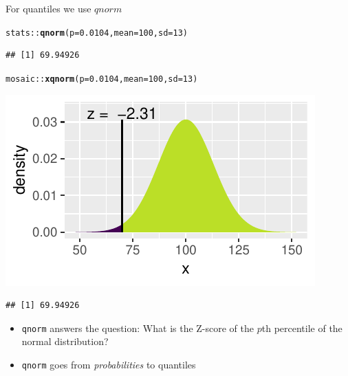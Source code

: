 \documentclass[handout]{beamer}\usepackage[]{graphicx}\usepackage[]{color}
\newcommand{\hlnum}[1]{\textcolor[rgb]{0.686,0.059,0.569}{#1}}%
\newcommand{\hlopt}[1]{\textcolor[rgb]{0,0,0}{#1}}%
\newcommand{\hlstd}[1]{\textcolor[rgb]{0.345,0.345,0.345}{#1}}%
\newcommand{\hlkwc}[1]{\textcolor[rgb]{0.333,0.667,0.333}{#1}}%
\newcommand{\hlkwd}[1]{\textcolor[rgb]{0.737,0.353,0.396}{\textbf{#1}}}%
\newenvironment{knitrout}{}{} %
\begin{document}
\begin{frame}[fragile]{For quantiles we use $qnorm$}



\begin{knitrout}\scriptsize
{}\color{fgcolor}
\begin{alltt}
\hlstd{stats}\hlopt{::}\hlkwd{qnorm}\hlstd{(}\hlkwc{p} \hlstd{=} \hlnum{0.0104}\hlstd{,} \hlkwc{mean} \hlstd{=} \hlnum{100}\hlstd{,} \hlkwc{sd} \hlstd{=} \hlnum{13}\hlstd{)}
\end{alltt}
\begin{verbatim}
## [1] 69.94926
\end{verbatim}

\end{knitrout}

\pause 

\begin{knitrout}\scriptsize
{}\color{fgcolor}
\begin{alltt}
\hlstd{mosaic}\hlopt{::}\hlkwd{xqnorm}\hlstd{(}\hlkwc{p} \hlstd{=} \hlnum{0.0104}\hlstd{,} \hlkwc{mean} \hlstd{=} \hlnum{100}\hlstd{,} \hlkwc{sd} \hlstd{=} \hlnum{13}\hlstd{)}
\end{alltt}


{\centering \includegraphics[width=0.6\linewidth]{figure/probs5-1} 

}


\begin{verbatim}
## [1] 69.94926
\end{verbatim}

\end{knitrout}

\pause 

\small{
\begin{itemize}
	\item \texttt{qnorm} answers the question: What is the Z-score of the $p$th percentile of the normal distribution?
		
	\item \texttt{qnorm} goes from \textit{probabilities} to quantiles 
\end{itemize}
}
\end{frame}
\end{document}

